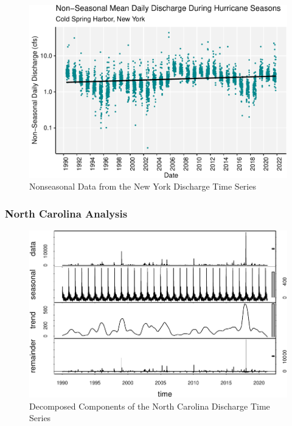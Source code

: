 \documentclass[
  12pt,
]{article}
\begin{document}
\begin{figure}

{\centering \includegraphics{BoosBrantleyHusted_ENV872_Project_files/figure-latex/NY-time-series-analysis-continued-1} 

}

\caption{Nonseasonal Data from the New York Discharge Time Series}\label{fig:NY-time-series-analysis-continued}
\end{figure}

\hypertarget{north-carolina-analysis}{%
\subsubsection{North Carolina Analysis}\label{north-carolina-analysis}}

\begin{figure}

{\centering \includegraphics{BoosBrantleyHusted_ENV872_Project_files/figure-latex/NC-time-series-analysis-1} 

}

\caption{Decomposed Components of the North Carolina Discharge Time Series}\label{fig:NC-time-series-analysis}
\end{figure}
\end{document}
